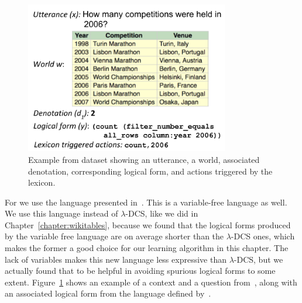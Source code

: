 \subsubsection{\WTQ{}}
\begin{figure}
    \centering
    \includegraphics[width=3.5in]{figures/wtq_example_with_var_free_lang.png}
    \caption{Example from \WTQ{} dataset showing an utterance, a world, associated denotation, corresponding logical form, and actions triggered by the lexicon.}
    \label{fig:wtq_example_with_mapo_lang}
\end{figure}
For \WTQ{} we use the language presented in~\cite{liang2018memory}. This is a
variable-free language as well. We use this language instead of $\lambda$-DCS,
like we did in Chapter~\ref{chapter:wikitables}, because we found that the
logical forms produced by the variable free language are on average shorter than
the $\lambda$-DCS ones, which makes the former a good choice for our learning
algorithm in this chapter. The lack of variables makes this new language less
expressive than $\lambda$-DCS, but we actually found that to be helpful in
avoiding spurious logical forms to some extent. Figure~\ref{fig:wtq_example_with_mapo_lang}
shows an example of a context and a question from~\WTQ{}, along with an associated
logical form from the language defined by~\cite{liang2018memory}.

